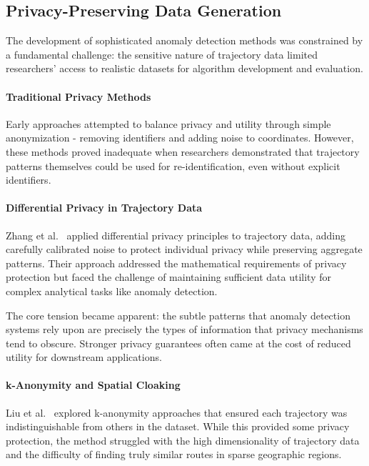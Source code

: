 \documentclass[runningheads]{llncs}
\begin{document}
\subsection{Privacy-Preserving Data Generation}
\label{sec:privacy-review}

The development of sophisticated anomaly detection methods was constrained by a fundamental challenge: the sensitive nature of trajectory data limited researchers' access to realistic datasets for algorithm development and evaluation.

\paragraph{Traditional Privacy Methods}
Early approaches attempted to balance privacy and utility through simple anonymization - removing identifiers and adding noise to coordinates. However, these methods proved inadequate when researchers demonstrated that trajectory patterns themselves could be used for re-identification, even without explicit identifiers.

\paragraph{Differential Privacy in Trajectory Data}
Zhang et al.~\cite{zhang2023differential} applied differential privacy principles to trajectory data, adding carefully calibrated noise to protect individual privacy while preserving aggregate patterns. Their approach addressed the mathematical requirements of privacy protection but faced the challenge of maintaining sufficient data utility for complex analytical tasks like anomaly detection.

The core tension became apparent: the subtle patterns that anomaly detection systems rely upon are precisely the types of information that privacy mechanisms tend to obscure. Stronger privacy guarantees often came at the cost of reduced utility for downstream applications.

\paragraph{k-Anonymity and Spatial Cloaking}
Liu et al.~\cite{liu2023enhanced} explored k-anonymity approaches that ensured each trajectory was indistinguishable from others in the dataset. While this provided some privacy protection, the method struggled with the high dimensionality of trajectory data and the difficulty of finding truly similar routes in sparse geographic regions.
\end{document}

